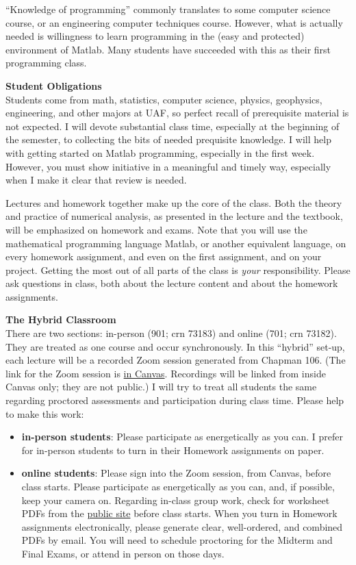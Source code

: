 \documentclass[12pt]{article}
\renewcommand{\emph}[1]{\textsf{\textbf{#1}}}
\newcommand{\localhead}[1]{\par\smallskip\textbf{#1} \smallskip\nobreak\\}%
\def\heading#1{\localhead{\large\emph{#1}}}
\begin{document}
``Knowledge of programming'' commonly translates to some computer science course, or an engineering computer techniques course.  However, what is actually needed is willingness to learn programming in the (easy and protected) environment of Matlab.  Many students have succeeded with this as their first programming class.

\heading{Student Obligations}
Students come from math, statistics, computer science, physics, geophysics, engineering, and other majors at UAF, so perfect recall of prerequisite material is not expected.  I will devote substantial class time, especially at the beginning of the semester, to collecting the bits of needed prequisite knowledge.  I will help with getting started on Matlab programming, especially in the first week.  However, you must show initiative in a meaningful and timely way, especially when I make it clear that review is needed.

Lectures and homework together make up the core of the class.  Both the theory and practice of numerical analysis, as presented in the lecture and the textbook, will be emphasized on homework and exams.  Note that you will use the mathematical programming language Matlab, or another equivalent language, on every homework assignment, and even on the first assignment, and on your project.  Getting the most out of all parts of the class is \textsl{your} responsibility.  Please ask questions in class, both about the lecture content and about the homework assignments.

\heading{The Hybrid Classroom}
There are two sections: in-person (901; crn 73183) and online (701; crn 73182).  They are treated as one course and occur synchronously.  In this ``hybrid'' set-up, each lecture will be a recorded Zoom session generated from Chapman 106.  (The link for the Zoom session is \href{https://canvas.alaska.edu/courses/21626}{in Canvas}.  Recordings will be linked from inside Canvas only; they are not public.)  I will try to treat all students the same regarding proctored assessments and participation during class time.  Please help to make this work:
\begin{itemize}
\item \textbf{in-person students}: Please participate as energetically as you can.  I prefer for in-person students to turn in their Homework assignments on paper.
\item \textbf{online students}:  Please sign into the Zoom session, from Canvas, before class starts.  Please participate as energetically as you can, and, if possible, keep your camera on.  Regarding in-class group work, check for worksheet PDFs from the \href{https://bueler.github.io/numerical/}{public site} before class starts.  When you turn in Homework assignments electronically, please generate clear, well-ordered, and combined PDFs by email.  You will need to schedule proctoring for the Midterm and Final Exams, or attend in person on those days.
\end{itemize}
\end{document}
